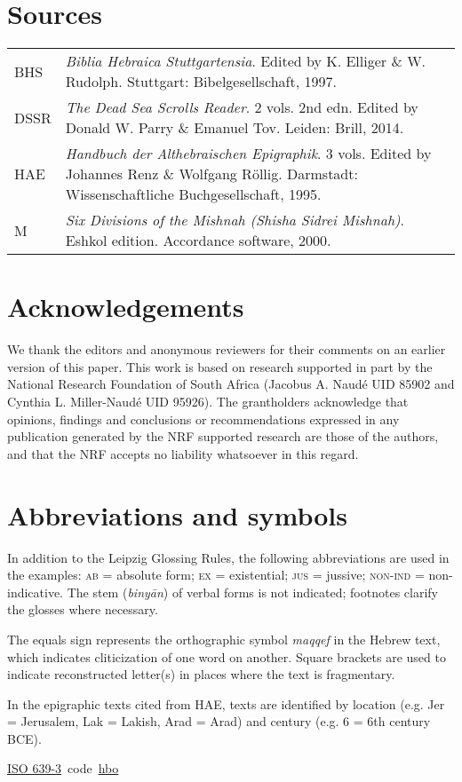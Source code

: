 ﻿\documentclass[output=paper]{langsci/langscibook}
\begin{document}
\section*{Sources}
\begin{tabularx}{\textwidth}{@{} l X @{}}
BHS     &\textit{Biblia Hebraica Stuttgartensia}. Edited by K. Elliger \&
W. Rudolph. Stuttgart: Bibelgesellschaft, 1997.\\
DSSR    &\textit{The Dead Sea Scrolls Reader}. 2 vols. 2nd edn. Edited by
Donald W. Parry \& Emanuel Tov. Leiden: Brill, 2014.\\
HAE     &\textit{Handbuch der Althebraischen Epigraphik}. 3 vols. Edited by
Johannes Renz \& Wolfgang Röllig. Darmstadt: Wissenschaftliche
Buchgesellschaft, 1995.\\
M       &\textit{Six Divisions of the Mishnah (Shisha Sidrei Mishnah)}.
Eshkol edition. Accordance software, 2000.
\end{tabularx}

\section*{Acknowledgements}

We thank the editors and anonymous reviewers for their comments on an
earlier version of this paper. This work is based on research supported in
part by the National Research Foundation of South Africa (Jacobus A. Naudé
UID 85902 and Cynthia L. Miller-Naudé UID 95926). The grantholders
acknowledge that opinions, findings and conclusions or recommendations
expressed in any publication generated by the NRF supported research are
those of the authors, and that the NRF accepts no liability whatsoever in
this regard.

\section*{Abbreviations and symbols}

In addition to the Leipzig Glossing Rules, the following abbreviations are
used in the examples: \textsc{ab} = absolute form; \textsc{ex} =
existential; \textsc{jus} = jussive; \textsc{non-ind} = non-indicative. The
stem (\textit{binyān}) of verbal forms is not indicated; footnotes clarify
the glosses where necessary.

The equals sign represents the orthographic symbol \textit{maqqef} in the
Hebrew text, which indicates cliticization of one word on another. Square
brackets are used to indicate reconstructed letter(s) in places where the
text is fragmentary.

In the epigraphic texts cited from HAE, texts are identified by location
(e.g. Jer = Jerusalem, Lak = Lakish, Arad = Arad) and century (e.g. 6 = 6th
century BCE).

\href{https://en.wikipedia.org/wiki/ISO_639-3}{{ISO 639-3}}~code~\href{http://www-01.sil.org/iso639-3/documentation.asp?id=hbo}{{hbo}}

%
{\sloppy\printbibliography[heading=subbibliography,notkeyword=this]}
\end{document}
